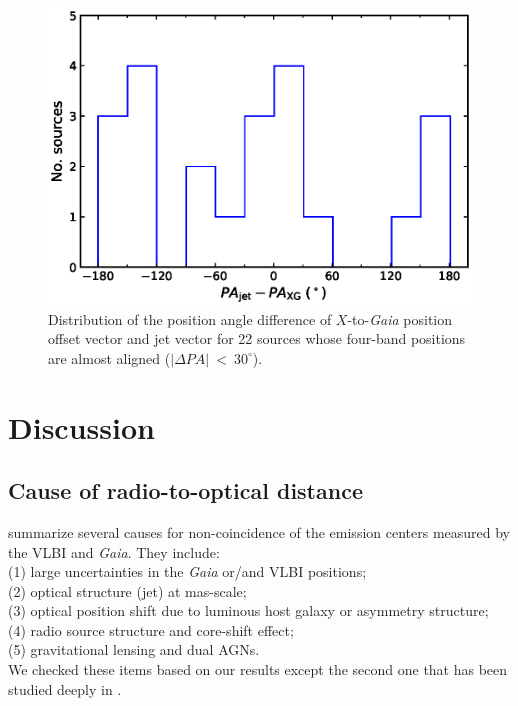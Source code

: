 \documentclass{aa}
\begin{document}

    \begin{figure}[hbtp]
        \centering
        \includegraphics[width=0.7\columnwidth]{figs/jet-pa-com}
        \caption[]{\label{fig:jet-pa-com}
            Distribution of the position angle difference of $X$-to-\textit{Gaia} position offset vector and jet vector for 22 sources whose four-band positions are almost aligned ($|\Delta PA|~<~30^{\circ}$).
        }
    \end{figure}


\section{Discussion} \label{subsec:discussion}
%

\subsection{Cause of radio-to-optical distance} \label{subsec:cause-of-VG}
%
    \citet{2017MNRAS.471.3775P} summarize several causes for non-coincidence of the emission centers measured by the VLBI and \textit{Gaia}.
    They include:\\
    (1) large uncertainties in the \textit{Gaia} or/and VLBI positions;\\
    (2) optical structure (jet) at mas-scale; \\
    (3) optical position shift due to luminous host galaxy or asymmetry structure;\\
    (4) radio source structure and core-shift effect;\\
    (5) gravitational lensing and dual AGNs.\\
    We checked these items based on our results except the second one that has been studied deeply in \citet{2017A&A...598L...1K,2017MNRAS.467L..71P,2017MNRAS.471.3775P,2019MNRAS.482.3023P,2019ApJ...871..143P,2020MNRAS.493L..54K}. %
\end{document}
